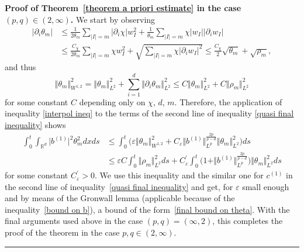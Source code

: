 \documentclass[a4paper,10pt]{article}
\newenvironment{proof}[1][Proof]{\noindent\textbf{#1.} }{\ \rule{0.5em}{0.5em}}
\begin{document}
\begin{proof}[Proof of Theorem~\ref{theorem a priori estimate} in the case
$(p,q) \in (2,\infty)$]
We start by observing
\begin{align*}
\vert \partial_{i}\theta_{m}\vert  &  \leq\frac{1}{2\theta_{m}} 
\sum_{\vert I\vert =m} \vert \partial_{i}\chi \vert
w_{I}^{2}+\frac{1}{\theta_{m}}\sum_{\vert I\vert =m}\chi\vert
w_{I}\vert \vert \partial_{i}w_{I}\vert \\
& \leq\frac{C_{\chi}}{2\theta_{m}}\sum_{\vert I \vert =m}\chi
w_{I}^{2}+\sqrt{\sum_{\vert I \vert =m}\chi \vert \partial
_{i}w_{I} \vert ^{2}}
\leq\frac{C_{\chi}}{2}\sqrt{\theta_{m}}+\sqrt{\rho_{m}},
\end{align*}
and thus
\[
\Vert \theta_{m} \Vert _{W^{1,2}}^{2}= \Vert \theta
_{m} \Vert_{L^{2}}^{2}+\sum_{i=1}^{d} \Vert \partial_{i}\theta
_{m} \Vert _{L^{2}}^{2}\leq C \Vert \theta_{m} \Vert _{L^{2} 
}^{2}+C \Vert \rho_{m} \Vert _{L^{2}}^{2} 
\]
for some constant $C$ depending only on $\chi$, $d$, $m$. Therefore, the application of inequality \eqref{interpol ineq} to the terms of the second line of inequality \eqref{quasi final inequality} shows
\begin{align*}
\int_{0}^{t}\int_{\mathbb{R}^{d}} \vert b^{(1)} \vert
^{2}\theta_{m}^{2}dxds &  \leq\int_{0}^{t} \Big(\varepsilon \Vert
\theta_{m} \Vert _{W^{1,2}}^{2}+C_{\varepsilon} \Vert b^{(
1)} \Vert _{L^{p}}^{\frac{2p}{p-d}} \Vert \theta
_{m} \Vert _{L^{2}}^{2} \Big)  ds\\
&  \leq\varepsilon C\int_{0}^{t} \Vert \rho_{m} \Vert _{L^{2}} 
^{2}ds+C_{\varepsilon}^{\prime}\int_{0}^{t} \Big( 1+ \Vert b^{(1)
}\Vert _{L^{p}}^{\frac{2p}{p-d}} \Big) \Vert \theta_{m} \Vert
_{L^{2}}^{2}ds
\end{align*}
for some constant $C_{\varepsilon}^{\prime}>0$. We use this inequality and the
similar one for $c^{(1)}$ in the second line of inequality~\eqref{quasi final inequality} and get, for $\varepsilon$ small enough and by
means of the Gronwall lemma (applicable because of the inequality~\eqref{bound on b}), a
bound of the form~\eqref{final bound on theta}. With the final arguments used
above in the case $(p,q)=(\infty,2)$, this completes the proof of the theorem in the case $p,q\in(2,\infty)$.
\end{proof}
\end{document}
